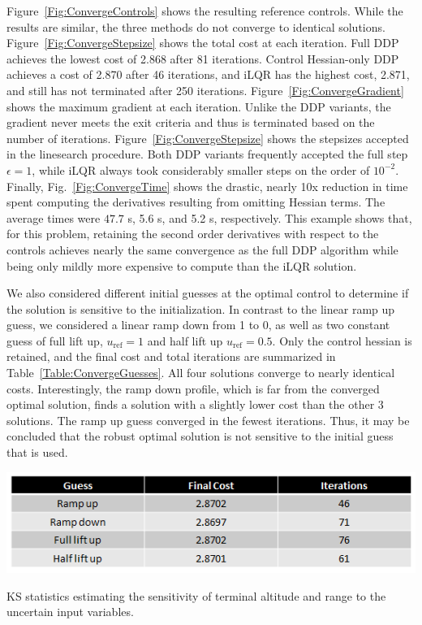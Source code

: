 Figure~\ref{Fig:ConvergeControls} shows the resulting reference controls. While the results are similar, the three methods do not converge to identical solutions. 
Figure~\ref{Fig:ConvergeStepsize} shows the total cost at each iteration. Full DDP achieves the lowest cost of 2.868 after 81 iterations. Control Hessian-only DDP achieves a cost of 2.870 after 46 iterations, and iLQR has the highest cost, 2.871, and still has not terminated after 250 iterations. Figure~\ref{Fig:ConvergeGradient} shows the maximum gradient at each iteration. Unlike the DDP variants, the gradient never meets the exit criteria and thus is terminated based on the number of iterations. 
Figure~\ref{Fig:ConvergeStepsize} shows the stepsizes accepted in the linesearch procedure. Both DDP variants frequently accepted the full step $\epsilon=1$, while iLQR always took considerably smaller steps on the order of $ 10^{-2} $. Finally, Fig.~\ref{Fig:ConvergeTime} shows the drastic, nearly 10x reduction in time spent computing the derivatives resulting from omitting Hessian terms. The average times were $47.7$ s, 5.6 s, and 5.2 s, respectively. 
This example shows that, for this problem, retaining the second order derivatives with respect to the controls achieves nearly the same convergence as the full DDP algorithm while being only mildly more expensive to compute than the iLQR solution. 

We also considered different initial guesses at the optimal control to determine if the solution is sensitive to the initialization. In contrast to the linear ramp up guess, we considered a linear ramp down from 1 to 0, as well as two constant guess of full lift up, $u_{\mathrm{ref}}=1$ and half lift up $u_{\mathrm{ref}}=0.5$. Only the control hessian is retained, and the final cost and total iterations are summarized in Table~\ref{Table:ConvergeGuesses}. All four solutions converge to nearly identical costs. Interestingly, the ramp down profile, which is far from the converged optimal solution, finds a solution with a slightly lower cost than the other 3 solutions. The ramp up guess converged in the fewest iterations. Thus, it may be concluded that the robust optimal solution is not sensitive to the initial guess that is used. 
\begin{table}[h!]
	\centering
	\includegraphics[width=1\textwidth]{Images/Convergence/ConvergeGuesses}
	\caption{KS statistics estimating the sensitivity of terminal altitude and range to the uncertain input variables.}
	\label{Table:ConvergeGuesses}
\end{table}

